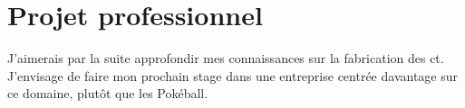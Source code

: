 \documentclass[../main.tex]{subfiles}
\begin{document}
\section{Projet professionnel}

J'aimerais par la suite approfondir mes connaissances sur la fabrication des \acrlong{ct}. J'envisage de faire mon prochain stage dans une entreprise centrée davantage sur ce domaine, plutôt que les Pokéball.
\end{document}

